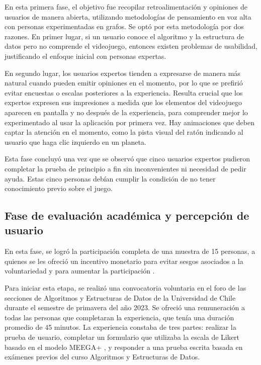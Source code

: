 En esta primera fase, el objetivo fue recopilar retroalimentación y opiniones de usuarios de manera abierta, utilizando metodologías de pensamiento en voz alta con personas experimentadas en grafos. Se optó por esta metodología por dos razones. En primer lugar, si un usuario conoce el algoritmo y la estructura de datos pero no comprende el videojuego, entonces existen problemas de usabilidad, justificando el enfoque inicial con personas expertas.

En segundo lugar, los usuarios expertos tienden a expresarse de manera más natural cuando pueden emitir opiniones en el momento, por lo que se prefirió evitar encuestas o escalas posteriores a la experiencia. Resulta crucial que los expertos expresen sus impresiones a medida que los elementos del videojuego aparecen en pantalla y no después de la experiencia, para comprender mejor lo experimentado al usar la aplicación por primera vez. Hay animaciones que deben captar la atención en el momento, como la pista visual del ratón indicando al usuario que haga clic izquierdo en un planeta.

Esta fase concluyó una vez que se observó que cinco usuarios expertos pudieron completar la prueba de principio a fin sin inconvenientes ni necesidad de pedir ayuda. Estas cinco personas debían cumplir la condición de no tener conocimiento previo sobre el juego.

\subsection{Fase de evaluación académica y percepción de usuario}

En esta fase, se logró la participación completa de una muestra de 15 personas, a quienes se les ofreció un incentivo monetario para evitar sesgos asociados a la voluntariedad y para aumentar la participación \cite{Marinescu2018IncentivesCR, Dallmeyer2023ToPayOrNot}.

Para iniciar esta etapa, se realizó una convocatoria voluntaria en el foro de las secciones de Algoritmos y Estructuras de Datos de la Universidad de Chile durante el semestre de primavera del año 2023. Se ofreció una remuneración a todas las personas que completaran la experiencia, que tenía una duración promedio de 45 minutos. La experiencia constaba de tres partes: realizar la prueba de usuario, completar un formulario que utilizaba la escala de Likert basado en el modelo MEEGA+ \cite{meegaplus}, y responder a una prueba escrita basada en exámenes previos del curso Algoritmos y Estructuras de Datos.

